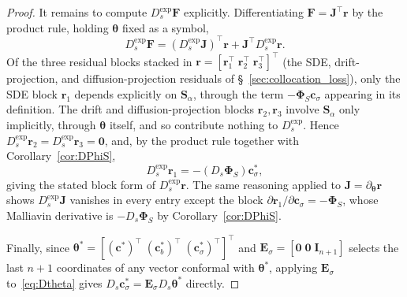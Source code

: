 \documentclass[11pt, a4paper]{article}
\theoremstyle{theoremstyle}
\theoremstyle{definitionstyle}
\begin{document}
\begin{proof}
    It remains to compute $D_s^{\exp}\mathbf F$ explicitly. Differentiating $\mathbf F = \mathbf J^\top \mathbf r$ by the product rule, holding $\boldsymbol\theta$ fixed as a symbol,
    \begin{equation}
        D_s^{\exp}\mathbf F = (D_s^{\exp}\mathbf J)^\top \mathbf r + \mathbf J^\top D_s^{\exp}\mathbf r.
    \end{equation}
    Of the three residual blocks stacked in $\mathbf r = [\mathbf r_1^\top \; \mathbf r_2^\top \; \mathbf r_3^\top]^\top$ (the SDE, drift-projection, and diffusion-projection residuals of \S~\ref{sec:collocation_loss}), only the SDE block $\mathbf r_1$ depends explicitly on $\mathbf S_\alpha$, through the term $-\boldsymbol\Phi_S \mathbf c_\sigma$ appearing in its definition. The drift and diffusion-projection blocks $\mathbf r_2, \mathbf r_3$ involve $\mathbf S_\alpha$ only implicitly, through $\boldsymbol\theta$ itself, and so contribute nothing to $D_s^{\exp}$. Hence $D_s^{\exp}\mathbf r_2 = D_s^{\exp}\mathbf r_3 = \mathbf 0$, and, by the product rule together with Corollary~\ref{cor:DPhiS},
    \begin{equation}
        D_s^{\exp}\mathbf r_1 = -(D_s \boldsymbol\Phi_S)\mathbf c_\sigma^*,
    \end{equation}
    giving the stated block form of $D_s^{\exp}\mathbf r$. The same reasoning applied to $\mathbf J = \partial_{\boldsymbol\theta}\mathbf r$ shows $D_s^{\exp}\mathbf J$ vanishes in every entry except the block $\partial \mathbf r_1 / \partial \mathbf c_\sigma = -\boldsymbol\Phi_S$, whose Malliavin derivative is $-D_s \boldsymbol\Phi_S$ by Corollary~\ref{cor:DPhiS}.
 
    Finally, since $\boldsymbol\theta^* = [(\mathbf c^*)^\top \; (\mathbf c_b^*)^\top \; (\mathbf c_\sigma^*)^\top]^\top$ and $\mathbf E_\sigma = [\mathbf 0 \; \mathbf 0 \; \mathbf I_{n+1}]$ selects the last $n+1$ coordinates of any vector conformal with $\boldsymbol\theta^*$, applying $\mathbf E_\sigma$ to~\eqref{eq:Dtheta} gives $D_s \mathbf c_\sigma^* = \mathbf E_\sigma D_s \boldsymbol\theta^*$ directly.
\end{proof}
\end{document}
